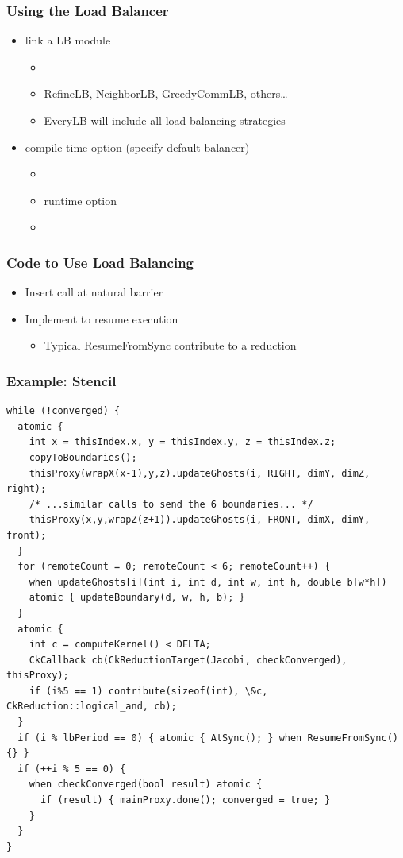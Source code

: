 \begin{frame}[fragile]
\frametitle{Using the Load Balancer}
\begin{itemize}
\item link a LB module 
\begin{itemize}
\item {}
\item RefineLB, NeighborLB, GreedyCommLB, others…
\item EveryLB will include all load balancing strategies
\end{itemize}
\item compile time option (specify default balancer)
\begin{itemize}
\item {}
\item runtime option
\item {}
\end{itemize}
\end{itemize}
\end{frame}

\begin{frame}
\frametitle{Code to Use Load Balancing}
\begin{itemize}
\item Insert  call at natural barrier
\item Implement  to resume execution
\begin{itemize}
\item Typical ResumeFromSync contribute to a reduction
\end{itemize}
\end{itemize}
\end{frame}

\begin{frame}[fragile]
\frametitle{Example: Stencil}
\begin{lstlisting}[basicstyle=\tiny]
while (!converged) {
  atomic {
    int x = thisIndex.x, y = thisIndex.y, z = thisIndex.z;
    copyToBoundaries();
    thisProxy(wrapX(x-1),y,z).updateGhosts(i, RIGHT, dimY, dimZ, right);
    /* ...similar calls to send the 6 boundaries... */
    thisProxy(x,y,wrapZ(z+1)).updateGhosts(i, FRONT, dimX, dimY, front);
  }
  for (remoteCount = 0; remoteCount < 6; remoteCount++) {
    when updateGhosts[i](int i, int d, int w, int h, double b[w*h])
    atomic { updateBoundary(d, w, h, b); }
  }
  atomic {
    int c = computeKernel() < DELTA;
    CkCallback cb(CkReductionTarget(Jacobi, checkConverged), thisProxy);
    if (i%5 == 1) contribute(sizeof(int), \&c, CkReduction::logical_and, cb);
  }
  if (i % lbPeriod == 0) { atomic { AtSync(); } when ResumeFromSync() {} }
  if (++i % 5 == 0) {
    when checkConverged(bool result) atomic {
      if (result) { mainProxy.done(); converged = true; }
    }
  }
}
\end{lstlisting}
\end{frame}

